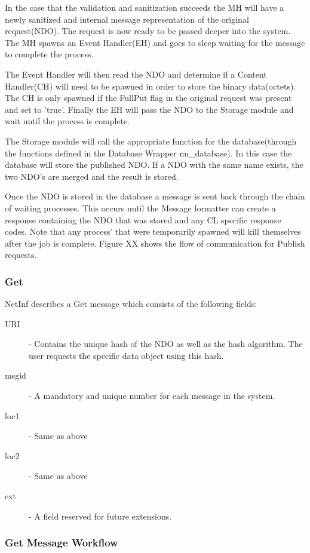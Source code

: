 In the case that the validation and sanitization succeeds the MH will have a newly sanitized and internal message representation of the original request(NDO). The request is now ready to be passed deeper into the system. The MH spawns an Event Handler(EH) and goes to sleep waiting for the message to complete the process. 

The Event Handler will then read the NDO and determine if a Content Handler(CH) will need to be spawned in order to store the binary data(octets). The CH is only spawned if the FullPut flag in the original request was present and set to 'true'. Finally the EH will pass the NDO to the Storage module and wait until the process is complete.

The Storage module will call the appropriate function for the database(through the functions defined in the Database Wrapper nn\_database). In this case the database will store the published NDO. If a NDO with the same name exists, the two NDO's are merged and the result is stored.

Once the NDO is stored in the database a message is sent back through the chain of waiting processes. This occurs until the Message formatter can create a response containing the NDO that was stored and any CL specific response codes. Note that any process' that were temporarily spawned will kill themselves after the job is complete. Figure XX shows the flow of communication for Publish requests.  


\subsubsection{Get}

NetInf describes a Get message which consists of the following fields:

\begin{description}
\item[URI] - Contains the unique hash of the NDO as well as the hash algorithm. The user requests the specific data object using this hash.
\item[msgid]- A mandatory and unique number for each message in the system.
\item[loc1] - Same as above
\item[loc2] - Same as above
\item[ext]  - A field reserved for future extensions.
\end{description}

\subsubsection{Get Message Workflow}

